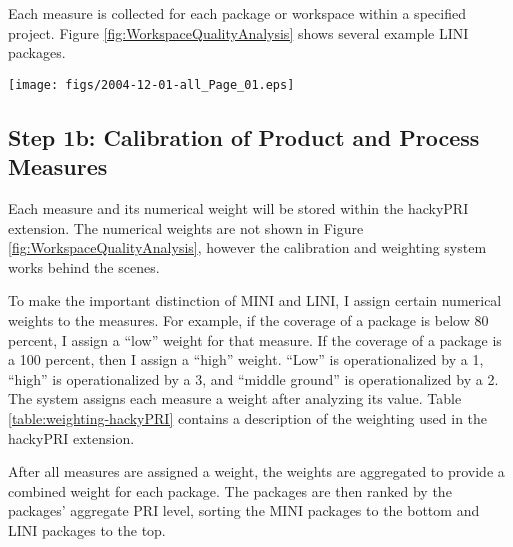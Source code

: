 Each measure is collected for each package or workspace within a specified
project. Figure \ref{fig:WorkspaceQualityAnalysis} shows several example
LINI packages.

\begin{figure*}[ht]
  \centering
  \texttt{[image: figs/2004-12-01-all\_Page\_01.eps]}
  \caption{The Workspace PRI analysis. Workspaces are listed with its
  respective PRI ranking and the measures.
}
  \label{fig:WorkspaceQualityAnalysis}
\end{figure*}


\subsection{Step 1b: Calibration of Product and Process Measures}
Each measure and its numerical weight will be stored within the hackyPRI
extension. The numerical weights are not shown in Figure
\ref{fig:WorkspaceQualityAnalysis}, however the calibration and weighting
system works behind the scenes. 

To make the important distinction of MINI and LINI, I assign certain
numerical weights to the measures. For example, if the coverage of a
package is below 80 percent, I assign a ``low'' weight for that measure. If
the coverage of a package is a 100 percent, then I assign a ``high''
weight. ``Low'' is operationalized by a 1, ``high'' is operationalized by a
3, and ``middle ground'' is operationalized by a 2. The system assigns each
measure a weight after analyzing its value. Table
\ref{table:weighting-hackyPRI} contains a description of the weighting used
in the hackyPRI extension.

After all measures are assigned a weight, the weights are aggregated to
provide a combined weight for each package. The packages are then ranked by
the packages' aggregate PRI level, sorting the MINI packages to the bottom
and LINI packages to the top.


